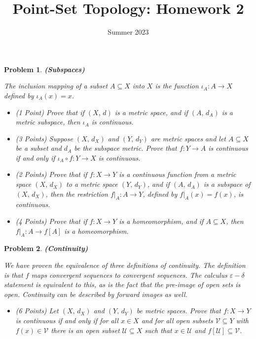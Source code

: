 \documentclass{article}
\title{Point-Set Topology: Homework 2}
\date{Summer 2023}
\theoremstyle{normal}
\newtheorem{problem}{Problem}
\begin{document}
    \maketitle
    \begin{problem}
        \textbf{(Subspaces)}
        \par\hfill\par
        The inclusion mapping of a subset $A\subseteq{X}$ into $X$ is the
        function $\iota_{A}:A\rightarrow{X}$ defined by $\iota_{A}(x)=x$.
        \begin{itemize}
            \item (1 Point) Prove that if $(X,\,d)$ is a metric space, and if
                $(A,\,d_{A})$ is a metric subspace, then $\iota_{A}$ is
                continuous.
            \item (3 Points) Suppose $(X,\,d_{X})$ and $(Y,\,d_{Y})$ are
                metric spaces and let $A\subseteq{X}$ be a subset and
                $d_{A}$ be the subspace metric. Prove that $f:Y\rightarrow{A}$
                is continuous \textit{if and only if}
                $\iota_{A}\circ{f}:Y\rightarrow{X}$ is continuous.
            \item (2 Points)
                Prove that if $f:X\rightarrow{Y}$ is a continuous function
                from a metric space $(X,\,d_{X})$ to a metric space
                $(Y,\,d_{Y})$, and if $(A,\,d_{A})$ is a subspace of
                $(X,\,d_{X})$, then the restriction $f|_{A}:A\rightarrow{Y}$,
                defined by $f|_{A}(x)=f(x)$, is continuous.
            \item (4 Points) Prove that if $f:X\rightarrow{Y}$ is a
                homeomorphism, and if $A\subseteq{X}$, then
                $f|_{A}:A\rightarrow{f}[A]$ is a homeomorphism.
        \end{itemize}
    \end{problem}
    \begin{problem}
        \textbf{(Continuity)}
        \par\hfill\par
        We have proven the equivalence of three definitions of continuity.
        The definition is that $f$ maps convergent sequences to convergent
        sequences. The calculus $\varepsilon-\delta$ statement is equivalent to
        this, as is the fact that the pre-image of open sets is open. Continuity
        can be described by forward images as well.
        \begin{itemize}
            \item (6 Points) Let $(X,\,d_{X})$ and $(Y,\,d_{Y})$ be metric
                spaces. Prove that $f:X\rightarrow{Y}$ is continuous if and only
                if for all $x\in{X}$ and for all open subsets
                $\mathcal{V}\subseteq{Y}$ with $f(x)\in\mathcal{V}$ there is an
                open subset $\mathcal{U}\subseteq{X}$ such that
                $x\in\mathcal{U}$ and $f[\mathcal{U}]\subseteq\mathcal{V}$.
        \end{itemize}
    \end{problem}
\end{document}
